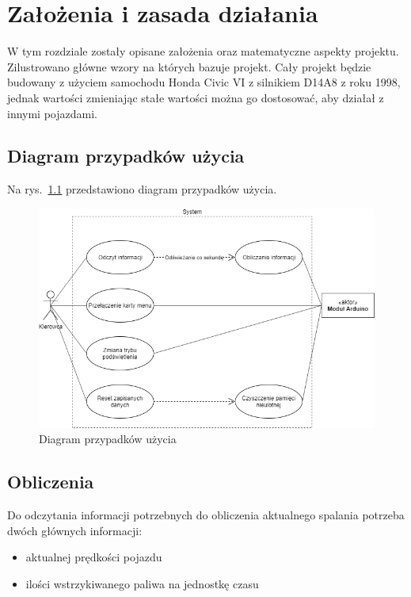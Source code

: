 \chapter{Założenia i zasada działania}
W tym rozdziale zostały opisane założenia oraz matematyczne aspekty projektu. Zilustrowano główne wzory na których bazuje projekt.
Cały projekt będzie budowany z użyciem samochodu Honda Civic VI z silnikiem D14A8 z roku 1998, jednak wartości zmieniając stałe wartości można go dostosować, aby działał z innymi pojazdami.

\section{Diagram przypadków użycia}
Na rys.~\ref{fig:diagram} przedstawiono diagram przypadków użycia.

\begin{figure}[!htb]
\centering
\includegraphics[width=1\linewidth]{Rysunki/diagram.png}
\caption{Diagram przypadków użycia}
\label{fig:diagram}
\end{figure}

\section{Obliczenia}
\par Do odczytania informacji potrzebnych do obliczenia aktualnego spalania potrzeba dwóch głównych informacji:
\begin{itemize}
\item{aktualnej prędkości pojazdu}
\item{ilości wstrzykiwanego paliwa na jednostkę czasu}
\end{itemize}

